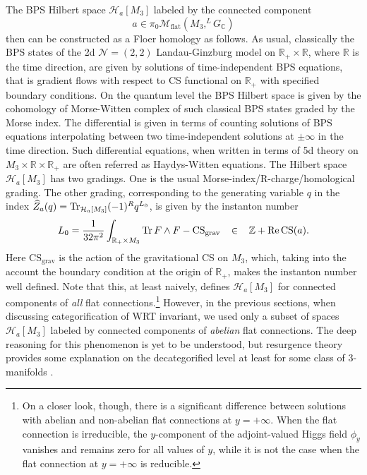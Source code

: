 \documentclass[hyper,letterpaper]{JHEP3}
\newcommand{\Z}{{\mathbb Z}}
\newcommand{\R}{{\mathbb R}}
\newcommand{\C}{{\mathbb C}}
\renewcommand{\hat}{\widehat}
\def\CH{{\mathcal H}}
\def\CM{{\mathcal M}}
\def\CN{{\mathcal N}}
\newcommand{\Tr}{{\rm Tr}}
\begin{document}
The BPS Hilbert space $\CH_a[M_3]$ labeled by the connected component
\begin{equation}
a\in \pi_0\CM_\text{flat}(M_3, ^LG_\C)
\label{aHW}
\end{equation}
then can be constructed as a Floer homology as follows. As usual, classically the BPS states of the 2d $\CN = (2,2)$ Landau-Ginzburg model on $\R_+\times \R$, where $\R$ is the time direction, are given by solutions of time-independent BPS equations, that is gradient flows with respect to CS functional on $\R_+$ with specified boundary conditions. On the quantum level the BPS Hilbert space is given by the cohomology of Morse-Witten complex of such classical BPS states graded by the Morse index. The differential is given in terms of counting solutions of BPS equations interpolating between two time-independent solutions at $\pm\infty$ in the time direction. Such differential equations, when written in terms of 5d theory on $M_3\times \R\times \R_+$ are often referred as Haydys-Witten equations\cite{Haydys:2010dv,Witten:2011zz}. The Hilbert space $\CH_a[M_3]$ has two gradings. One is the usual Morse-index/R-charge/homological grading. The other grading, corresponding to the generating variable $q$ in the index $\hat{Z}_a(q)=\Tr_{\CH_a[M_3]} (-1)^R q^{L_0}$, is given by the instanton number
\begin{equation}
L_0=\frac{1}{32\pi^2}\int_{\R_+\times M_3}\Tr \,F \wedge F - \text{CS}_\text{grav}\;\;\;\in\;\;\; \Z+\text{Re}\,\text{CS}(a).
\end{equation}
Here $\text{CS}_\text{grav}$ is the action of the gravitational CS on $M_3$, which, taking into the account the boundary condition at the origin of $\R_+$, makes the instanton number well defined. Note that this, at least naively, defines $\CH_a[M_3]$ for connected components of \textit{all} flat connections.\footnote{On a closer look, though, there is a significant difference between solutions with abelian and non-abelian flat connections at $y=+\infty$. When the flat connection is irreducible, the $y$-component of the adjoint-valued Higgs field $\phi_y$ vanishes and remains zero for all values of $y$, while it is not the case when the flat connection at $y = + \infty$ is reducible.} However, in the previous sections, when discussing categorification of WRT invariant, we used only a subset of spaces $\CH_a[M_3]$ labeled by connected components of \textit{abelian} flat connections. The deep reasoning for this phenomenon is yet to be understood, but resurgence theory provides some explanation on the decategorified level at least for some class of 3-manifolds \cite{Gukov:2016njj}.
\end{document}
